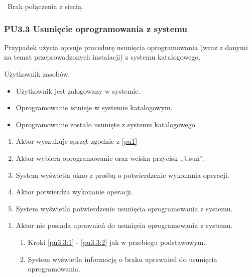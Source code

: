 \
Brak połączenia z siecią.

\subsubsection{PU3.3 Usunięcie oprogramowania z systemu}

Przypadek użycia opisuje procedurę usunięcia oprogramowania (wraz z danymi na temat przeprowadzonych instalacji) z systemu katalogowego.

Użytkownik zasobów.

\begin{itemize}
\item Użytkownik jest zalogowany w systemie.
\item Oprogramowanie istnieje w systemie katalogowym.
\end{itemize}

\begin{itemize}
\item Oprogramowanie zostało usunięte z systemu katalogowego.
\end{itemize}

\begin{enumerate}
\item \label{pu3.3:1} Aktor wyszukuje sprzęt zgodnie z \ref{pu1}
\item \label{pu3.3:2} Aktor wybiera oprogramowanie oraz wciska przycisk ,,Usuń''.
\item System wyświetla okno z prośbą o potwierdzenie wykonania operacji.
\item Aktor potwierdza wykonanie operacji.
\item System wyświetla potwierdzenie usunięcia oprogramowania z systemu.
\end{enumerate}

\begin{enumerate}
\item Aktor nie posiada uprawnień do usunięcia oprogramowania z systemu.
	\begin{enumerate}[label*=\arabic*.]
		\item Kroki \ref{pu3.3:1} - \ref{pu3.3:2} jak w przebiegu podstawowym.
		\item System wyświetla informację o braku uprawnień do usunięcia oprogramowania.
	\end{enumerate}
\end{enumerate}

